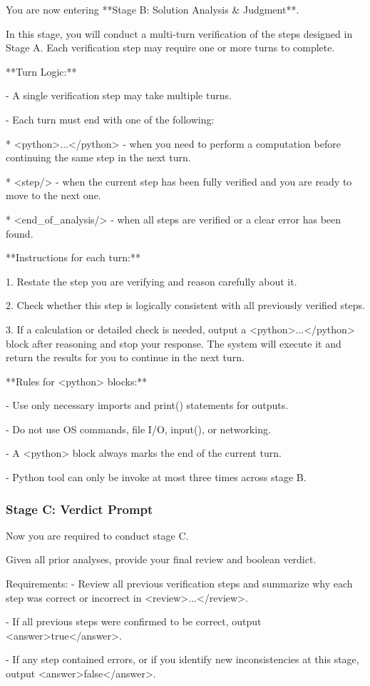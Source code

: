 \documentclass[11pt]{article}
\begin{document}
\begin{promptbox}
You are now entering **Stage B: Solution Analysis \& Judgment**.

In this stage, you will conduct a multi-turn verification of the steps designed in Stage A.
Each verification step may require one or more turns to complete.

**Turn Logic:**

- A single verification step may take multiple turns.

- Each turn must end with one of the following:

  * <python>...</python> - when you need to perform a computation before continuing the same step in the next turn.
  
  * <step/> - when the current step has been fully verified and you are ready to move to the next one.
  
  * <end\_of\_analysis/> - when all steps are verified or a clear error has been found.

**Instructions for each turn:**

1. Restate the step you are verifying and reason carefully about it.

2. Check whether this step is logically consistent with all previously verified steps.

3. If a calculation or detailed check is needed, output a <python>...</python> block after reasoning and stop your response.  
   The system will execute it and return the results for you to continue in the next turn.

**Rules for <python> blocks:**

- Use only necessary imports and print() statements for outputs.

- Do not use OS commands, file I/O, input(), or networking.

- A <python> block always marks the end of the current turn.

- Python tool can only be invoke at most three times across stage B.

\end{promptbox}

\subsubsection{Stage C: Verdict Prompt}
\label{sec:appendix_review_prompt}

\begin{promptbox}
Now you are required to conduct stage C.

Given all prior analyses, provide your final review and boolean verdict.

Requirements:
- Review all previous verification steps and summarize why each step was correct or incorrect in <review>...</review>.

- If all previous steps were confirmed to be correct, output <answer>true</answer>.

- If any step contained errors, or if you identify new inconsistencies at this stage, output <answer>false</answer>.
\end{promptbox}
\end{document}
